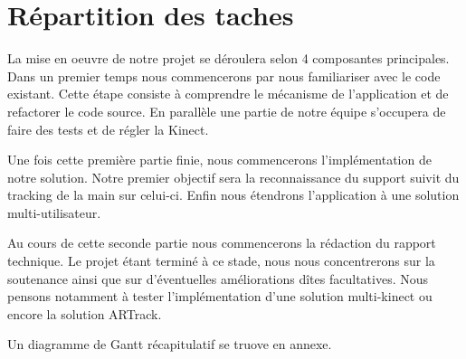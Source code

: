 \chapter{Répartition des taches}

La mise en oeuvre de notre projet se déroulera selon 4 composantes principales. 
Dans un premier temps nous commencerons par nous familiariser avec le code existant. Cette étape consiste à comprendre le mécanisme de l'application et de refactorer le code source. En parallèle une partie de notre équipe s'occupera de faire des tests et de régler la Kinect.

Une fois cette première partie finie, nous commencerons l'implémentation de notre solution. Notre premier objectif sera la reconnaissance du support suivit du tracking de la main sur celui-ci. Enfin nous étendrons l'application à une solution  multi-utilisateur.

Au cours de cette seconde partie nous commencerons la rédaction du rapport technique. Le projet étant terminé à ce stade, nous nous concentrerons sur la soutenance ainsi que sur d'éventuelles améliorations dîtes facultatives. Nous pensons notamment à tester l'implémentation d'une solution multi-kinect ou encore la solution ARTrack.

Un diagramme de Gantt récapitulatif se truove en annexe.